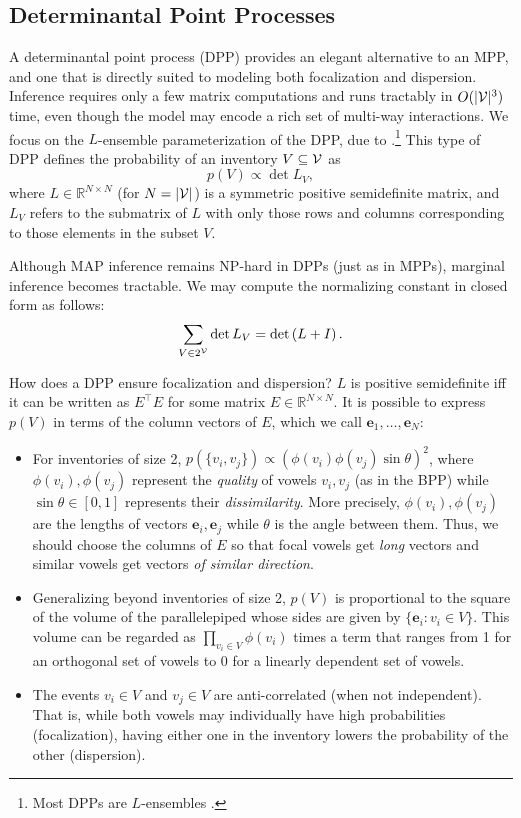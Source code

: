 \documentclass[11pt,a4paper]{article}
\renewcommand{\cite}[2][]{\citep[#1]{#2}}
\renewcommand{\newcite}[2][]{\citet[#1]{#2}}
\renewcommand{\vec}[1]{{\boldsymbol{\mathbf{#1}}}}
\newcommand{\Real}{\mathbb{R}}
\begin{document}
\subsection{Determinantal Point Processes}
A determinantal point process (DPP) \cite{macchi1975coincidence} provides an elegant alternative to an MPP, and one that is directly suited to modeling both focalization and dispersion.  Inference
requires only a few matrix computations and runs tractably in $O(|{\cal V}|^3)$
time, even though the model may encode a rich set of multi-way interactions. 
We focus on the $L$-ensemble parameterization of the DPP, due to
\newcite{borodin2005eynard}.\footnote{Most DPPs are
  $L$-ensembles \cite{MAL-044}.} This type of DPP
  defines the probability of an inventory $V \subseteq \cal V$ as
\begin{equation}\label{eq:dpp}
  p(V) \propto \det L_{V},
\end{equation} 
where $L \in \Real^{N \times N}$ 
(for $N=|{\cal V}|$) is a symmetric
positive semidefinite matrix, 
and $L_V$ refers to the
submatrix of $L$ with only those rows and columns corresponding to
those elements in the subset $V$.

Although MAP inference remains NP-hard in DPPs 
(just as in MPPs), marginal inference becomes tractable.  We may compute the normalizing constant in closed form as follows:
\begin{equation}
  \sum_{V \in 2^{\cal V}} \det L_{V} = \det\left(L + I \right).
\end{equation}

How does a DPP ensure focalization and dispersion?  $L$ is positive semidefinite iff it can be written as $E^\top E$ for some matrix $E \in \Real^{N \times N}$.  It is possible to express $p(V)$ in terms of the column vectors of $E$, which we call $\vec{e}_1, \ldots, \vec{e}_N$:
\begin{itemize}[noitemsep]
\item For inventories of size 2, $p(\{v_i,v_j\}) \propto (\phi(v_i) \phi(v_j) \sin \theta)^2$, where $\phi(v_i), \phi(v_j)$ represent the {\em quality} of vowels $v_i, v_j$ (as in the BPP) while $\sin \theta \in [0,1]$ represents their {\em dissimilarity}.  More precisely, $\phi(v_i), \phi(v_j)$ are the lengths of vectors $\vec{e}_i, \vec{e}_j$ while $\theta$ is the angle between them.
Thus, we should choose the columns of $E$ so that focal vowels get {\em long} vectors and similar vowels get vectors {\em of similar direction}.
\item Generalizing beyond inventories of size 2, $p(V)$ is proportional to the square of the volume of the parallelepiped whose sides are given by $\{\vec{e}_i: v_i \in V\}$.  This volume can be regarded as $\prod_{v_i \in V} \phi(v_i)$ times a term that ranges from 1 for an orthogonal set of vowels to 0 for a linearly dependent set of vowels.
  \item The events $v_i \in V$ and $v_j \in V$ are anti-correlated (when not independent).  That is, while both vowels may individually have high probabilities (focalization), having either one in the inventory lowers the probability of the other (dispersion).
\end{itemize}
\end{document}
